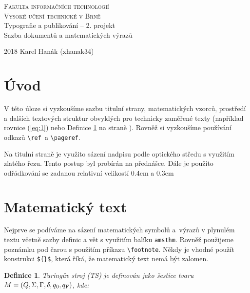 \documentclass[11pt,a4paper]{article}
\newtheorem{definition}{Definice}
\begin{document}
\begin{titlepage}
\begin{center}
{\Huge
\textsc{Fakulta informačních technologií\\[0,4em]Vysoké učení technické v Brně}}\\
{\LARGE Typografie a publikování – 2. projekt\\[0,3em]Sazba dokumentů a matematických výrazů}\\
\end{center}
{\Large 2018 \hfill
Karel Hanák (xhanak34)}
\end{titlepage}
\begin{twocolumn}
\section*{Úvod}\label{pg:1}
V této úloze si vyzkoušíme sazbu titulní strany, matematic\-kých vzorců, prostředí a dalších textových struktur obvyklých pro technicky zaměřené texty (například rovnice (\ref{eq:1}) nebo Definice \ref{def:1} na straně \pageref{pg:1}). Rovněž si vyzkoušíme používání odkazů \verb|\ref |a \verb|\pageref|.

Na titulní straně je využito sázení nadpisu podle optického středu s využitím zlatého řezu. Tento postup byl probírán na přednášce. Dále je použito odřádkování se zadanou relativní velikostí 0.4em a 0.3em\\

\section{Matematický text}
Nejprve se podíváme na sázení matematických symbolů a~výrazů v plynulém textu včetně sazby definic a vět s využitím balíku \texttt{amsthm}. Rovněž použijeme poznámku pod čarou s použitím příkazu \verb|\footnote|. Někdy je vhodné použít konstrukci \verb|${}$|, která říká, že matematický text nemá být zalomen.

\theoremstyle{definition}
\begin{definition}\label{def:1}
{\normalfont Turingův stroj} (TS) je definován jako šestice tvaru $M = (Q, \Sigma, \Gamma , \delta, q\textsubscript{0}, q\textsubscript{F})$, kde:


\end{definition}
\end{twocolumn}
\end{document}
